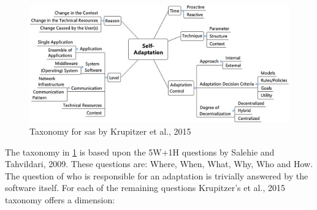 \begin{figure}[t]
    \includegraphics[width=\textwidth]{images/KrupitzerTaxonomy.jpg}
    \caption{Taxonomy for \acrlong{sas} by Krupitzer et al., 2015\cite*{SurveyOnEngineeringApproaches}}
    \label{fig:KrupitzerTaxonomy}
\end{figure}
The taxonomy in \figurename{\ref{fig:KrupitzerTaxonomy}} 
is based upon the 5W+1H questions by Salehie and Tahvildari, 2009\cite*{LandscapeAndResearchChallenges}.
These questions are: Where, When, What, Why, Who and How.
The question of who is responsible for an adaptation is trivially answered by the software itself.
For each of the remaining questions Krupitzer's et al., 2015\cite*{SurveyOnEngineeringApproaches} taxonomy offers a dimension:



